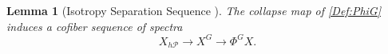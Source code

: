 \documentclass[11pt]{amsart}
\newtheorem{lemma}[equation]{Lemma}
\newtheorem{proposition}[equation]{Proposition}
\theoremstyle{definition}
\numberwithin{equation}{subsection} %
\def\z{\mathbb{Z}}
\def\ker{\operatorname{ker}}
\def\coker{\operatorname{coker}}
\def\mfz{\underline{\mathbb{Z}}}
\def\Sp{\operatorname{Sp}}
\begin{document}
\begin{lemma}[Isotropy Separation Sequence {\cite[Section 2.5.2]{HHR16}}]
The collapse map of \cref{Def:PhiG} induces a cofiber sequence of spectra
$$ X_{h\mathcal P} \to X^G \to \Phi^G X. $$
\end{lemma}



\end{document}
